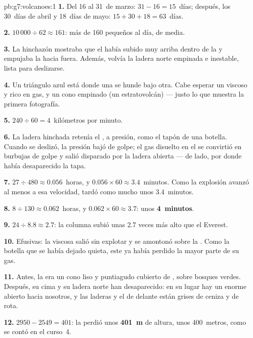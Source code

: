 \begin{solution}{pb:g7:volcanoes:1}
\textbf{1.} Del 16 al 31~de marzo: $31 - 16 = 15$~días; después, los
30~días de abril y 18~días de mayo: $15 + 30 + 18 = 63$~días.

\textbf{2.} $10\,000 \div 62 \approx 161$: más de 160 pequeños 
al día, de media.

\textbf{3.} La hinchazón mostraba que el  había subido muy arriba
dentro de la  y empujaba la  hacia fuera. Además, volvía la
ladera norte empinada e inestable, lista para deslizarse.

\textbf{4.} Un triángulo azul está donde una  se hunde bajo otra.
Cabe esperar un  viscoso y rico en gas,  y un
cono empinado (un estratovolcán) --- justo lo que muestra la primera
fotografía.

\textbf{5.} $240 \div 60 = 4$~kilómetros por minuto.

\textbf{6.} La ladera hinchada retenía el , a presión, como el tapón de
una botella. Cuando se deslizó, la presión bajó de golpe; el gas disuelto
en el  se convirtió en burbujas de golpe y salió disparado por la
ladera abierta --- de lado, por donde había desaparecido la tapa.

\textbf{7.} $27 \div 480 \approx 0.056$~horas, y $0.056 \times 60 \approx
3.4$~minutos. Como la explosión avanzó al menos a esa velocidad, tardó
como mucho unos 3.4~minutos.

\textbf{8.} $8 \div 130 \approx 0.062$~horas, y $0.062 \times 60 \approx
3.7$: unos \textbf{4~minutos}.

\textbf{9.} $24 \div 8.8 \approx 2.7$: la columna subió unas 2.7 veces más
alto que el Everest.

\textbf{10.} Efusivas: la  viscosa salió sin explotar y se amontonó
sobre la . Como la botella que se había dejado quieta, este  ya
había perdido la mayor parte de su gas.

\textbf{11.} Antes, la  era un cono liso y puntiagudo cubierto de
, sobre bosques verdes. Después, su cima y su ladera norte han
desaparecido: en su lugar hay un enorme  abierto hacia nosotros, y las
laderas y el  de delante están grises de ceniza y de  rota.

\textbf{12.} $2950 - 2549 = 401$: la  perdió unos
\textbf{401~m} de altura, unos 400~metros, como se contó en el curso~4.
\end{solution}
